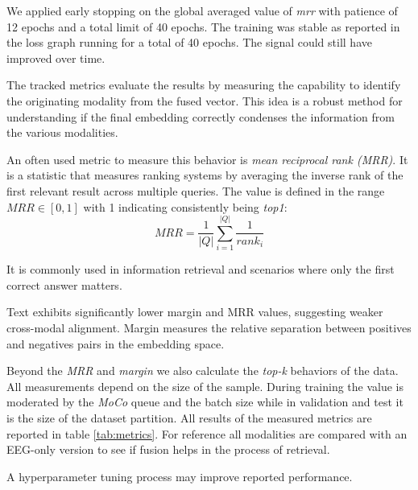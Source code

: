 We applied early stopping on the global averaged value of \textit{mrr} with patience of 12 epochs and a total limit of 40 epochs.
The training was stable as reported in the loss graph running for a total of 40 epochs.
The signal could still have improved over time.

The tracked metrics evaluate the results by measuring the capability to identify the originating modality from the fused vector.
This idea is a robust method for understanding if the final embedding correctly condenses the information from the various modalities.

An often used metric to measure this behavior is \textit{mean reciprocal rank (MRR)}.
It is a statistic that measures ranking systems by averaging the inverse rank of the first relevant result across multiple queries.
The value is defined in the range $MRR \in [0,1]$ with 1 indicating consistently being \textit{top1}:
$$MRR = \frac{1}{|Q|} \sum_{i=1}^{|Q|} \frac{1}{rank_i}$$

It is commonly used in information retrieval and scenarios where only the first correct answer matters.

Text exhibits significantly lower margin and MRR values, suggesting weaker cross-modal alignment.
Margin measures the relative separation between positives and negatives pairs in the embedding space.

Beyond the \textit{MRR} and \textit{margin} we also calculate the \textit{top-k} behaviors of the data.
All measurements depend on the size of the sample.
During training the value is moderated by the \textit{MoCo} queue and the batch size while in validation and test
it is the size of the dataset partition.
All results of the measured metrics are reported in table \ref{tab:metrics}.
For reference all modalities are compared with an EEG-only version to see if fusion helps in the process of retrieval.

A hyperparameter tuning process may improve reported performance.



